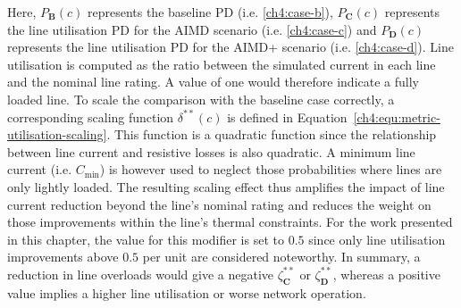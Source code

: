 \nomenclature[L]{$C_\text{min}$}{Minimum necessary line loading to take the changes into account, where $C_\text{min} \in [0, 1)$}





Here, $P_\textbf{B}(c)$ represents the baseline PD (i.e. \ref{ch4:case-b}), $P_\textbf{C}(c)$ represents the line utilisation PD for the AIMD scenario (i.e. \ref{ch4:case-c}) and $P_\textbf{D}(c)$ represents the line utilisation PD for the AIMD+ scenario (i.e. \ref{ch4:case-d}).
Line utilisation is computed as the ratio between the simulated current in each line and the nominal line rating.
A value of one would therefore indicate a fully loaded line.
To scale the comparison with the baseline case correctly, a corresponding scaling function $\delta^{**}(c)$ is defined in Equation~\ref{ch4:equ:metric-utilisation-scaling}.
This function is a quadratic function since the relationship between line current and resistive losses is also quadratic.
A minimum line current (i.e. $C_\text{min}$) is however used to neglect those probabilities where lines are only lightly loaded.
The resulting scaling effect thus amplifies the impact of line current reduction beyond the line's nominal rating and reduces the weight on those improvements within the line's thermal constraints.
For the work presented in this chapter, the value for this modifier is set to $0.5$ since only line utilisation improvements above $0.5$ per unit are considered noteworthy.
In summary, a reduction in line overloads would give a negative $\zeta^{**}_\textbf{C}$ or $\zeta^{**}_\textbf{D}$, whereas a positive value implies a higher line utilisation or worse network operation.

